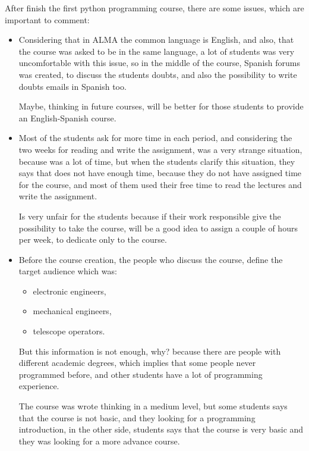 \documentclass[letter, 10pt]{article}
\begin{document}
After finish the first python programming course,
there are some issues, which are important to comment:

\begin{itemize}
    \item Considering that in ALMA the common language is English,
          and also, that the course was asked to be in the same language,
          a lot of students was very uncomfortable with this  issue,
          so in the middle of the course, Spanish forums was created,
          to discuss the students doubts, and also the possibility to
          write doubts emails in Spanish too.

          Maybe, thinking in future courses, will be better for those
          students to provide an English-Spanish course.

    \item Most of the students ask for more time in each period,
          and considering the two weeks for reading and write the assignment,
          was a very strange situation, because was a lot of time,
          but when the students clarify this situation,
          they says that does not have enough time, because they do not
          have assigned time for the course, and most of them used their
          free time to read the lectures and write the assignment.

          Is very unfair for the students because if their
          work responsible give the possibility to take the course,
          will be a good idea to assign a couple of hours per week,
          to dedicate only to the course.

    \item Before the course creation, the people who discuss the course,
          define the target audience which was:
          \begin{itemize}
              \item electronic engineers,
              \item mechanical engineers,
              \item telescope operators.
          \end{itemize}

          But this information is not enough, why?
          because there are people with different academic degrees,
          which implies that some people never programmed before,
          and other students have a lot of programming experience.

          The course was wrote thinking in a medium level,
          but some students says that the course is not basic,
          and they looking for a programming introduction,
          in the other side, students says that the course is
          very basic and they was looking for a more advance course.


\end{itemize}
\end{document}
